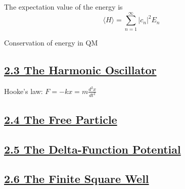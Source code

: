 The expectation value of the energy is
    $$\langle H \rangle = \sum_{n=1}^{\infty} |c_n|^2 E_n$$

Conservation of energy in QM

\subsection{\underline{2.3 The Harmonic Oscillator}}
Hooke's law: $F = -kx = m \frac{d^2 x}{d t^2}$

\subsection{\underline{2.4 The Free Particle}}

\subsection{\underline{2.5 The Delta-Function Potential}}

\subsection{\underline{2.6 The Finite Square Well}}


